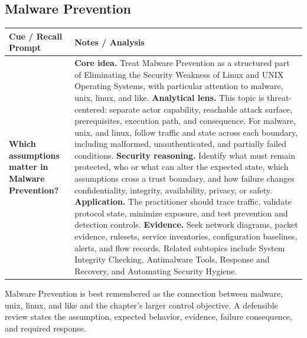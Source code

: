 \documentclass[11pt]{article}
\newcommand{\CornellHeader}{%
\rowcolor{Navy}\color{white}\bfseries Cue / Recall Prompt & \color{white}\bfseries Notes / Analysis\\\hline}
\newcommand{\CornellRow}[2]{%
\cellcolor{CueGray}\RaggedRight\textbf{#1} & \RaggedRight #2\\\hline}
\begin{document}
\subsection*{Malware Prevention}
\begin{longtable}{>{\RaggedRight\arraybackslash}p{}|>{\RaggedRight\arraybackslash}p{}}
\CornellHeader
\CornellRow{Which assumptions matter in Malware Prevention?}{\textbf{Core idea.} Treat Malware Prevention as a structured part of Eliminating the Security Weakness of Linux and UNIX Operating Systems, with particular attention to malware, unix, linux, and like. \textbf{Analytical lens.} This topic is threat-centered: separate actor capability, reachable attack surface, prerequisites, execution path, and consequence. For malware, unix, and linux, follow traffic and state across each boundary, including malformed, unauthenticated, and partially failed conditions. \textbf{Security reasoning.} Identify what must remain protected, who or what can alter the expected state, which assumptions cross a trust boundary, and how failure changes confidentiality, integrity, availability, privacy, or safety. \textbf{Application.} The practitioner should trace traffic, validate protocol state, minimize exposure, and test prevention and detection controls. \textbf{Evidence.} Seek network diagrams, packet evidence, rulesets, service inventories, configuration baselines, alerts, and flow records. Related subtopics include System Integrity Checking, Antimalware Tools, Response and Recovery, and Automating Security Hygiene.}
\end{longtable}
\begin{topicsummary}
Malware Prevention is best remembered as the connection between malware, unix, linux, and like and the chapter's larger control objective. A defensible review states the assumption, expected behavior, evidence, failure consequence, and required response.
\end{topicsummary}
\end{document}
